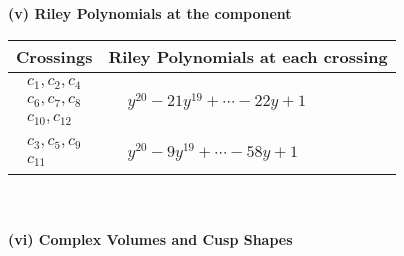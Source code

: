 \documentclass[1p]{elsarticle_modified}
\theoremstyle{definition}
\begin{document}
\newpage\renewcommand{\arraystretch}{1}
\flushleft \textbf{(v) Riley Polynomials at the component}\newline \\
\begin{tabular}{m{50pt}|m{274pt}}
Crossings & \hspace{64pt}Riley Polynomials at each crossing \\
\hline $$\begin{aligned}c_{1},c_{2},c_{4}\\c_{6},c_{7},c_{8}\\c_{10},c_{12}\end{aligned}$$&$\begin{aligned}
&y^{20}-21 y^{19}+\cdots-22 y+1
\end{aligned}$\\
\hline $$\begin{aligned}c_{3},c_{5},c_{9}\\c_{11}\end{aligned}$$&$\begin{aligned}
&y^{20}-9 y^{19}+\cdots-58 y+1
\end{aligned}$\\
\hline
\end{tabular}\\~\\
\newpage\flushleft \textbf{(vi) Complex Volumes and Cusp Shapes}
\end{document}
